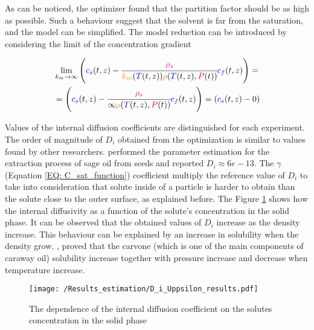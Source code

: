\documentclass[../Article_Model_Parameters.tex]{subfiles}
\begin{document}
	As can be noticed, the optimizer found that the partition factor should be as high as possible. Such a behaviour suggest that the solvent is far from the saturation, and the model can be simplified. The model reduction can be introduced by considering the limit of the concentration gradient
	
	{\footnotesize
	\begin{equation*}
		\begin{split}
			&\lim_{k_m \rightarrow \infty} \left({\color{blue}{\color{blue} c_s} }(t,z)  - \cfrac{{\color{magenta}\rho_s}}{{\color{orange}k_m}({\color{blue}T}(t,z)){\color{orange}\rho}({\color{blue}T}(t,z),{\color{red}P}(t))}  {\color{blue}c_f}(t,z) \right)  = \\
			&= \left({\color{blue}{\color{blue} c_s} }(t,z)  - \cfrac{{\color{magenta}\rho_s}}{\infty{\color{orange}\rho}({\color{blue}T}(t,z),{\color{red}P}(t))}  {\color{blue}c_f}(t,z) \right) = \left({\color{blue}{\color{blue} c_s} }(t,z) - 0 \right)
		\end{split}
	\end{equation*} }
		
	Values of the internal diffusion coefficients are distinguished for each experiment. The order of magnitude of $D_i$ obtained from the optimization is similar to values found by other researchers. \citet{Reverchon1996} performed the parameter estimation for the extraction process of sage oil from seeds and reported $D_i \approx 6e-13$. The $\gamma$ (Equation \ref{EQ: C_sat_function}) coefficient multiply the reference value of $D_i$ to take into consideration that solute inside of a particle is harder to obtain than the solute close to the outer surface, as explained before. The Figure \ref{fig:Di_upsilon_res} shows how the internal diffusivity as a function of the solute's concentration in the solid phase. It can be observed that the obtained values of $D_i$ increase as the density increase. This behaviour can be explained by an increase in solubility when the density grow. \citet{Shojaie2010}, proved that the carvone (which is one of the main components of caraway oil) solubility increase together with pressure increase and decrease when temperature increase.
	
	\begin{figure}
		\centering
		\texttt{[image: /Results\_estimation/D\_i\_Uppsilon\_results.pdf]}
		\caption{The dependence of the internal diffusion coefficient on the solutes concentration in the solid phase}
		\label{fig:Di_upsilon_res}
	\end{figure}
	
\end{document}
